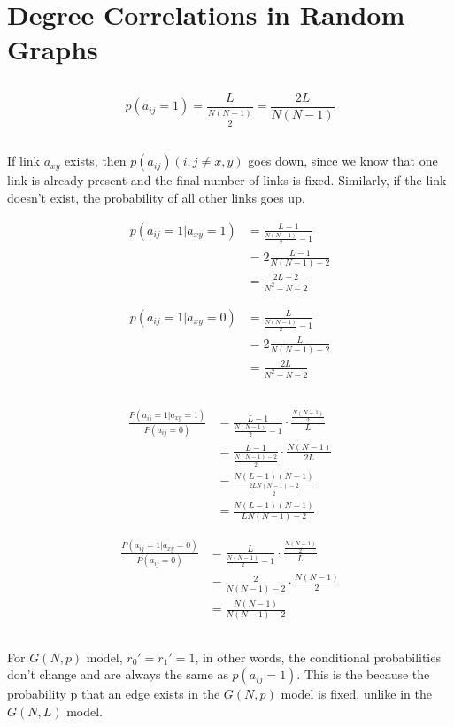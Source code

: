 \documentclass[../document.tex]{subfiles}
\begin{document}
\section{Degree Correlations in Random Graphs}
\subsection{}
$$ p(a_{ij} = 1) = \frac{ L }{ \frac{ N(N-1) }{ 2 } } = \frac{ 2L }{ N(N-1) } $$

\subsection{}
If link $ a_{xy} $ exists, then $ p(a_{ij}) (i,j \neq x,y) $ goes down, since we know that one link is already present and the final number of links is fixed. Similarly, if the link doesn't exist, the probability of all other links goes up.

\begin{align*}	
	p(a_{ij} = 1 | a_{xy} = 1) &= \frac{ L-1 }{ \frac{ N(N-1) }{ 2 } - 1 } \\
	&= 2 \frac{ L-1 }{ N(N-1) - 2 } \\
	&= \frac{ 2L-2 }{ N^2-N-2 }
\end{align*}

\begin{align*}	
	p(a_{ij} = 1 | a_{xy} = 0) &= \frac{ L }{ \frac{ N(N-1) }{ 2 } - 1 } \\
	&= 2 \frac{ L }{ N(N-1) - 2 } \\
	&= \frac{ 2L }{ N^2-N-2 }
\end{align*}

\subsection{}
\begin{align*}
	\frac{P \left( a_{ij} = 1 | a_{xy} = 1 \right)}{P \left( a_{ij}=0 \right)} &=\frac{L-1}{\frac{N(N-1)}{2}-1} \cdot \frac{\frac{N(N-1)}{2}}{L}\\
	&=\frac{L-1}{\frac{N(N-1)-2}{2}} \cdot \frac{N(N-1)}{2L}\\
	&= \frac{N(L-1)(N-1)}{\frac{2LN(N-1)-2}{2}}\\
	&= \frac{N(L-1)(N-1)}{LN(N-1)-2}
\end{align*}

\begin{align*}
	\frac{P \left( a_{ij} = 1 | a_{xy} = 0 \right)}{P \left( a_{ij}=0 \right)} &=\frac{L}{\frac{N(N-1)}{2}-1} \cdot \frac{\frac{N(N-1)}{2}}{L}\\
	&= \frac{2}{N(N-1)-2} \cdot \frac{N(N-1)}{2}\\
	&= \frac{N(N-1)}{N(N-1)-2}
\end{align*}

\subsection{}
For $G(N,p)$ model, $r_0' = r_1' = 1$, in other words, the conditional probabilities don't change and are always the same as $p(a_{ij} = 1)$. This is the because the probability p that an edge exists in the $G(N,p)$ model is fixed, unlike in the $G(N,L)$ model.

\subsection{}
\end{document}
